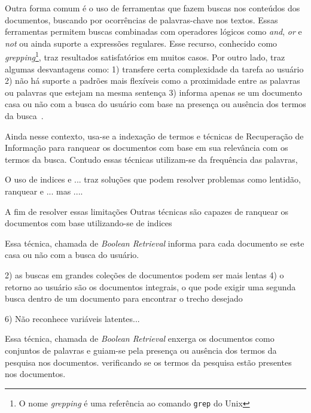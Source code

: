 

Outra forma comum é o uso de ferramentas que fazem buscas nos conteúdos dos documentos, buscando por ocorrências de palavras-chave nos textos. Essas ferramentas permitem buscas combinadas com operadores lógicos como \textit{and}, \textit{or} e \textit{not} ou ainda suporte a expressões regulares. Esse recurso, conhecido como \textit{grepping}\footnote{O nome \textit{grepping} é uma referência ao comando \texttt{grep} do Unix}, traz resultados satisfatórios em muitos casos. Por outro lado, traz algumas desvantagens como: 
1) transfere certa complexidade da tarefa ao usuário 
2) não há suporte a padrões mais flexíveis como a proximidade entre as palavras ou palavras que estejam na mesma sentença 
3) informa apenas se um documento casa ou não com a busca do usuário com base na presença ou ausência dos termos da busca~\cite{Aggarwal2012,Manning2008}. 

Ainda nesse contexto, usa-se a indexação de termos e técnicas de Recuperação de Informação para ranquear os documentos com base em sua relevância com os termos da busca. 
Contudo essas técnicas utilizam-se da frequência das palavras, 



O uso de indices e ... traz soluções que podem resolver problemas como lentidão, ranquear e ... mas ....

A fim de resolver essas limitações 
Outras técnicas são capazes de ranquear os documentos com base utilizando-se de indices 


Essa técnica, chamada de \textit{Boolean Retrieval} informa para cada documento se este casa ou não com a busca do usuário. 


2) as buscas em grandes coleções de documentos podem ser mais lentas 
4) o retorno ao usuário são os documentos integrais, o que pode exigir uma segunda busca dentro de um documento para encontrar o trecho desejado

6) Não reconhece variáveis latentes...

Essa técnica, chamada de \textit{Boolean Retrieval} enxerga os documentos como conjuntos de palavras e guiam-se 
pela presença ou ausência dos termos da pesquisa nos documentos. 
verificando se os termos da pesquisa estão presentes nos documentos.


